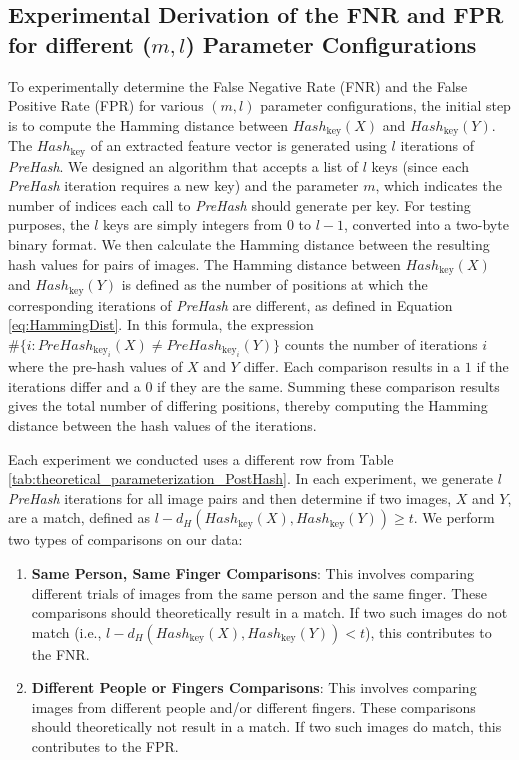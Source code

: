 \subsection{Experimental Derivation of the FNR and FPR for different (\(m, l\)) Parameter Configurations}

To experimentally determine the False Negative Rate (FNR) and the False Positive Rate (FPR) for various \((m, l)\) parameter configurations, the initial step is to compute the Hamming distance between \( Hash_{\text{key}}(X) \) and \( Hash_{\text{key}}(Y) \). The \( Hash_{\text{key}} \) of an extracted feature vector is generated using \( l \) iterations of \textit{PreHash}. We designed an algorithm that accepts a list of \( l \) keys (since each \textit{PreHash} iteration requires a new key) and the parameter \( m \), which indicates the number of indices each call to \textit{PreHash} should generate per key. For testing purposes, the \( l \) keys are simply integers from 0 to \( l-1 \), converted into a two-byte binary format. We then calculate the Hamming distance between the resulting hash values for pairs of images. The Hamming distance between \( Hash_{\text{key}}(X) \) and \( Hash_{\text{key}}(Y) \) is defined as the number of positions at which the corresponding iterations of \textit{PreHash} are different, as defined in Equation \ref{eq:HammingDist}. In this formula, the expression \( \# \{ i : PreHash_{\text{key}_i}(X) \neq PreHash_{\text{key}_i}(Y) \} \) counts the number of iterations \( i \) where the pre-hash values of \( X \) and \( Y \) differ. Each comparison results in a \(1\) if the iterations differ and a \(0\) if they are the same. Summing these comparison results gives the total number of differing positions, thereby computing the Hamming distance between the hash values of the iterations.


Each experiment we conducted uses a different row from Table \ref{tab:theoretical_parameterization_PostHash}. In each experiment, we generate \( l \) \textit{PreHash} iterations for all image pairs and then determine if two images, \(X\) and \(Y\), are a match, defined as \( l - d_H(Hash_{\text{key}}(X), Hash_{\text{key}}(Y)) \geq t \). We perform two types of comparisons on our data:

\begin{enumerate}
    \item \textbf{Same Person, Same Finger Comparisons}: This involves comparing different trials of images from the same person and the same finger. These comparisons should theoretically result in a match. If two such images do not match (i.e., \( l - d_H(Hash_{\text{key}}(X), Hash_{\text{key}}(Y)) < t \)), this contributes to the FNR.
    \item \textbf{Different People or Fingers Comparisons}: This involves comparing images from different people and/or different fingers. These comparisons should theoretically not result in a match. If two such images do match, this contributes to the FPR.
\end{enumerate}

